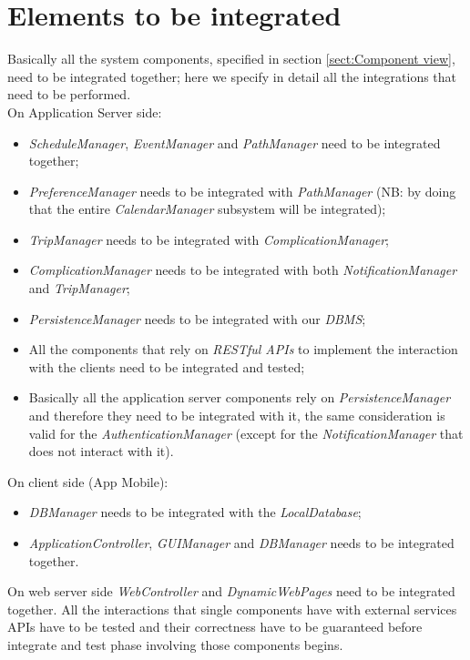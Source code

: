 \section{Elements to be integrated}
Basically all the system components, specified in section \ref{sect:Component view}, need to be integrated together; here we specify in detail all the integrations that need to be performed.\\
On Application Server side:
\begin{itemize}
	\item \textit{ScheduleManager}, \textit{EventManager} and \textit{PathManager} need to be integrated together;
	\item \textit{PreferenceManager} needs to be integrated with \textit{PathManager} (NB: by doing that the entire \textit{CalendarManager} subsystem will be integrated);
	\item \textit{TripManager} needs to be integrated with \textit{ComplicationManager};
	\item \textit{ComplicationManager} needs to be integrated with both \textit{NotificationManager} and \textit{TripManager};
	\item \textit{PersistenceManager} needs to be integrated with our \textit{DBMS};
	\item All the components that rely on \textit{RESTful APIs} to implement the interaction with the clients need to be integrated and tested;
	\item Basically all the application server components rely on \textit{PersistenceManager} and therefore they need to be integrated with it, the same consideration is valid for the \textit{AuthenticationManager} (except for the \textit{NotificationManager} that does not interact with it).
\end{itemize}
\newpage \noindent
On client side (App Mobile):
\begin{itemize}
	\item \textit{DBManager} needs to be integrated with the \textit{LocalDatabase};
	\item \textit{ApplicationController}, \textit{GUIManager} and \textit{DBManager} needs to be integrated together.
\end{itemize}
On web server side \textit{WebController} and \textit{DynamicWebPages} need to be integrated together.
All the interactions that single components have with external services APIs have to be tested and their correctness have to be guaranteed before integrate and test phase involving those components begins.

